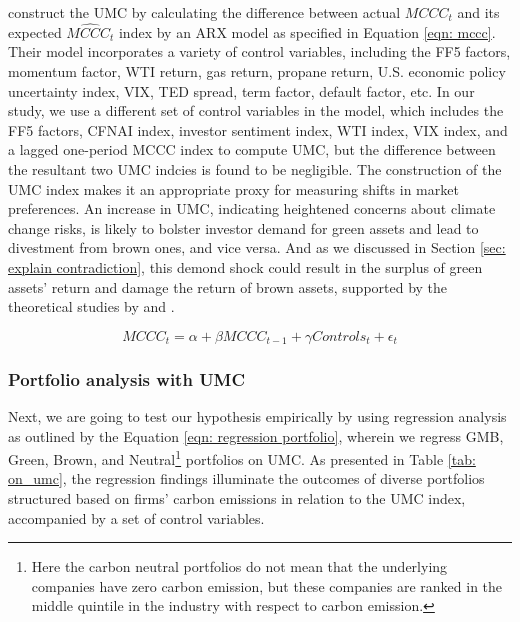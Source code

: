 \documentclass[12pt]{article}
\begin{document}
\cite{ardia2022climate} construct the UMC by calculating the difference between actual $MCCC_t$ and its expected $\widehat{MCCC_t}$ index by an ARX model as specified in Equation \ref{eqn: mccc}. Their model incorporates a variety of control variables, including the FF5 factors, momentum factor, WTI return, gas return, propane return, U.S. economic policy uncertainty index, VIX, TED spread, term factor, default factor, etc. In our study, we use a different set of control variables in the model, which includes the FF5 factors, CFNAI index, investor sentiment index, WTI index, VIX index, and a lagged one-period MCCC index to compute UMC, but the difference between the resultant two UMC indcies is found to be negligible. The construction of the UMC index makes it an appropriate proxy for measuring shifts in market preferences. An increase in UMC, indicating heightened concerns about climate change risks, is likely to bolster investor demand for green assets and lead to divestment from brown ones, and vice versa. And as we discussed in Section \ref{sec: explain contradiction}, this demond shock could result in the surplus of green assets' return and damage the return of brown assets, supported by the theoretical studies by \citet{koijen2019demand} and \citet{pastor2021sustainable}.

\begin{equation}
\label{eqn: mccc}
MCCC_t = \alpha + \beta MCCC_{t-1} + \gamma Controls_{t} + \epsilon_t
\end{equation}

\subsubsection{Portfolio analysis with UMC}

Next, we are going to test our hypothesis empirically by using regression analysis as outlined by the Equation \ref{eqn: regression portfolio}, wherein we regress GMB, Green, Brown, and Neutral\footnote{Here the carbon neutral portfolios do not mean that the underlying companies have zero carbon emission, but these companies are ranked in the middle quintile in the industry with respect to carbon emission.} portfolios on UMC. As presented in Table \ref{tab: on_umc}, the regression findings illuminate the outcomes of diverse portfolios structured based on firms' carbon emissions in relation to the UMC index, accompanied by a set of control variables. 
\end{document}
